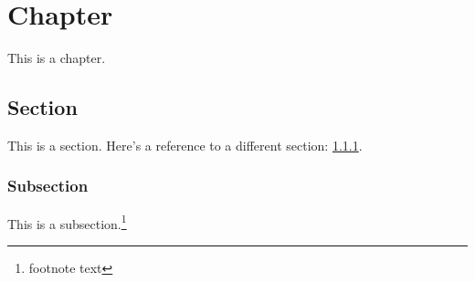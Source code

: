 %
\chapter[]{Chapter}

This is a chapter.

\section{Section}
\label{sec:asection}

This is a section.  Here's a reference to a different section:
\ref{sec:asubsection}.

\subsection{Subsection}
\label{sec:asubsection}

This is a subsection.\footnote{footnote text}

